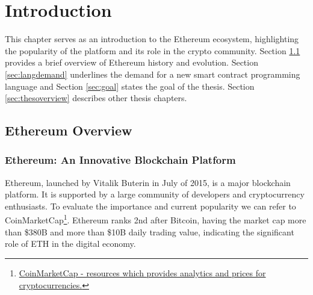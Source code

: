 \chapter{Introduction}
\label{chap:intro}

This chapter serves as an introduction to the Ethereum ecosystem, highlighting the popularity of the platform and its role in the crypto community. 
Section \ref{sec:ethoverview} provides a brief overview of Ethereum history and evolution. Section \ref{sec:langdemand} underlines the demand for a new smart contract programming language and Section \ref{sec:goal} states the goal of the thesis. Section \ref{sec:thesoverview} describes other thesis chapters.






\section{Ethereum Overview}
\label{sec:ethoverview}

\subsection{Ethereum: An Innovative Blockchain Platform}
Ethereum, launched by Vitalik Buterin in July of 2015, is a major blockchain platform. It is supported by a large community of developers and cryptocurrency enthusiasts. To evaluate the importance and current popularity we can refer to CoinMarketCap\footnote{\href{https://coinmarketcap.com/}{CoinMarketCap - resources which provides analytics and prices for cryptocurrencies.}}. Ethereum ranks 2nd after Bitcoin, having the market cap more than \$380B and more than \$10B daily trading value, indicating the significant role of ETH in the digital economy.

